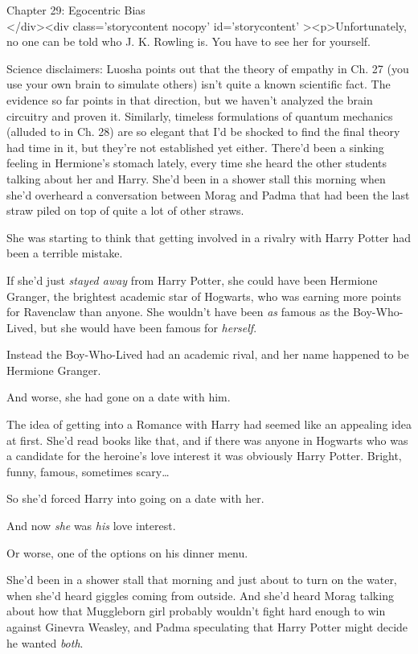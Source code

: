 
Chapter 29: Egocentric Bias\\
</div><div  class='storycontent nocopy' id='storycontent' ><p>Unfortunately, no 
one can be told who J. K. Rowling is. You have to see her for yourself.

Science disclaimers: Luosha points out that the theory of empathy in Ch. 27 
(you use your own brain to simulate others) isn't quite a known scientific 
fact. The evidence so far points in that direction, but we haven't analyzed the 
brain circuitry and proven it. Similarly, timeless formulations of quantum 
mechanics (alluded to in Ch. 28) are so elegant that I'd be shocked to find the 
final theory had time in it, but they're not established yet either.
\sbreak
There'd been a sinking feeling in Hermione's stomach lately, every time she 
heard the other students talking about her and Harry. She'd been in a shower 
stall this morning when she'd overheard a conversation between Morag and Padma 
that had been the last straw piled on top of quite a lot of other straws.

She was starting to think that getting involved in a rivalry with Harry Potter 
had been a terrible mistake.

If she'd just \emph{stayed away} from Harry Potter, she could have been 
Hermione Granger, the brightest academic star of Hogwarts, who was earning more 
points for Ravenclaw than anyone. She wouldn't have been \emph{as} famous as 
the Boy-Who-Lived, but she would have been famous for \emph{herself}.

Instead the Boy-Who-Lived had an academic rival, and her name happened to be 
Hermione Granger.

And worse, she had gone on a date with him.

The idea of getting into a Romance with Harry had seemed like an appealing idea 
at first. She'd read books like that, and if there was anyone in Hogwarts who 
was a candidate for the heroine's love interest it was obviously Harry Potter. 
Bright, funny, famous, sometimes scary{\ldots}

So she'd forced Harry into going on a date with her.

And now \emph{she} was \emph{his} love interest.

Or worse, one of the options on his dinner menu.

She'd been in a shower stall that morning and just about to turn on the water, 
when she'd heard giggles coming from outside. And she'd heard Morag talking 
about how that Muggleborn girl probably wouldn't fight hard enough to win 
against Ginevra Weasley, and Padma speculating that Harry Potter might decide 
he wanted \emph{both}.

